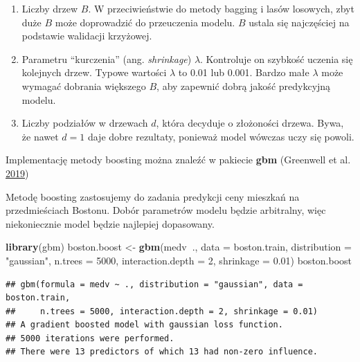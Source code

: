 \documentclass[
]{book}
\newenvironment{Shaded}{\begin{snugshade}}{\end{snugshade}}
\newcommand{\DataTypeTok}[1]{\textcolor[rgb]{0.13,0.29,0.53}{#1}}
\newcommand{\DecValTok}[1]{\textcolor[rgb]{0.00,0.00,0.81}{#1}}
\newcommand{\FloatTok}[1]{\textcolor[rgb]{0.00,0.00,0.81}{#1}}
\newcommand{\KeywordTok}[1]{\textcolor[rgb]{0.13,0.29,0.53}{\textbf{#1}}}
\newcommand{\NormalTok}[1]{#1}
\newcommand{\OperatorTok}[1]{\textcolor[rgb]{0.81,0.36,0.00}{\textbf{#1}}}
\newcommand{\StringTok}[1]{\textcolor[rgb]{0.31,0.60,0.02}{#1}}
\providecommand{\tightlist}{%
  \setlength{\itemsep}{0pt}\setlength{\parskip}{0pt}}
\theoremstyle{plain}
\theoremstyle{definition}
\theoremstyle{definition}
\theoremstyle{definition}
\theoremstyle{definition}
\theoremstyle{remark}
\let\BeginKnitrBlock\begin \let\EndKnitrBlock\end
\begin{document}
\begin{enumerate}
\def\labelenumi{\arabic{enumi}.}
\tightlist
\item
  Liczby drzew \(B\). W przeciwieństwie do metody bagging i lasów losowych, zbyt duże \(B\) może doprowadzić do przeuczenia modelu. \(B\) ustala się najczęściej na podstawie walidacji krzyżowej.
\item
  Parametru ``kurczenia'' (ang. \emph{shrinkage}) \(\lambda\). Kontroluje on szybkość uczenia się kolejnych drzew. Typowe wartości \(\lambda\) to 0.01 lub 0.001. Bardzo małe \(\lambda\) może wymagać dobrania większego \(B\), aby zapewnić dobrą jakość predykcyjną modelu.
\item
  Liczby podziałów w drzewach \(d\), która decyduje o złożoności drzewa. Bywa, że nawet \(d=1\) daje dobre rezultaty, ponieważ model wówczas uczy się powoli.
\end{enumerate}

Implementację metody boosting można znaleźć w pakiecie \textbf{gbm} (Greenwell et al. \protect\hyperlink{ref-R-gbm}{2019})

\BeginKnitrBlock{example}
\protect\hypertarget{exm:przyk53}{}{\label{exm:przyk53} }Metodę boosting zastosujemy do zadania predykcji ceny mieszkań na przedmieściach Bostonu. Dobór parametrów modelu będzie arbitralny, więc niekoniecznie model będzie najlepiej dopasowany.
\EndKnitrBlock{example}

\begin{Shaded}
\begin{Highlighting}[]
\KeywordTok{library}\NormalTok{(gbm)}
\NormalTok{boston.boost <-}\StringTok{ }\KeywordTok{gbm}\NormalTok{(medv}\OperatorTok{~}\NormalTok{., }\DataTypeTok{data =}\NormalTok{ boston.train,}
                    \DataTypeTok{distribution =} \StringTok{"gaussian"}\NormalTok{, }
                    \DataTypeTok{n.trees =} \DecValTok{5000}\NormalTok{,}
                    \DataTypeTok{interaction.depth =} \DecValTok{2}\NormalTok{,}
                    \DataTypeTok{shrinkage =} \FloatTok{0.01}\NormalTok{)}
\NormalTok{boston.boost}
\end{Highlighting}
\end{Shaded}

\begin{verbatim}
## gbm(formula = medv ~ ., distribution = "gaussian", data = boston.train, 
##     n.trees = 5000, interaction.depth = 2, shrinkage = 0.01)
## A gradient boosted model with gaussian loss function.
## 5000 iterations were performed.
## There were 13 predictors of which 13 had non-zero influence.
\end{verbatim}
\end{document}
